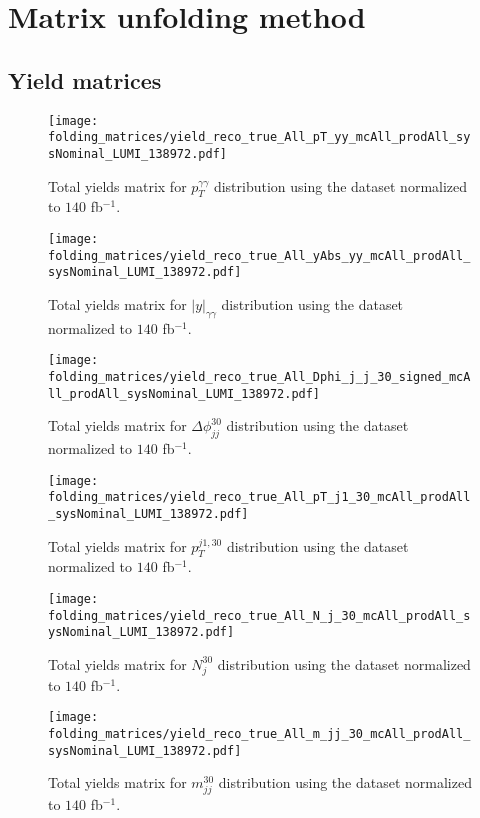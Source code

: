 \chapter{Matrix unfolding method}
\section{Yield matrices}
\vspace{1cm}
\begin{figure}[H]
\centering
\texttt{[image: folding\_matrices/yield\_reco\_true\_All\_pT\_yy\_mcAll\_prodAll\_sysNominal\_LUMI\_138972.pdf]}
\caption{Total yields matrix for $p_T^{\gamma\gamma}$ distribution using the dataset normalized to $140$ fb$^{-1}$.}
\end{figure}
\begin{figure}[H]
\centering
\texttt{[image: folding\_matrices/yield\_reco\_true\_All\_yAbs\_yy\_mcAll\_prodAll\_sysNominal\_LUMI\_138972.pdf]}
\caption{Total yields matrix for $|y|_{\gamma\gamma}$ distribution using the dataset normalized to $140$ fb$^{-1}$.}
\end{figure}
\begin{figure}[H]
\centering
\texttt{[image: folding\_matrices/yield\_reco\_true\_All\_Dphi\_j\_j\_30\_signed\_mcAll\_prodAll\_sysNominal\_LUMI\_138972.pdf]}
\caption{Total yields matrix for $\Delta\phi_{jj}^{30}$ distribution using the dataset normalized to $140$ fb$^{-1}$.}
\end{figure}
\begin{figure}[H]
\centering
\texttt{[image: folding\_matrices/yield\_reco\_true\_All\_pT\_j1\_30\_mcAll\_prodAll\_sysNominal\_LUMI\_138972.pdf]}
\caption{Total yields matrix for $p_T^{j1, 30}$ distribution using the dataset normalized to $140$ fb$^{-1}$.}
\end{figure}
\begin{figure}[H]
\centering
\texttt{[image: folding\_matrices/yield\_reco\_true\_All\_N\_j\_30\_mcAll\_prodAll\_sysNominal\_LUMI\_138972.pdf]}
\caption{Total yields matrix for $N_j^{30}$ distribution using the dataset normalized to $140$ fb$^{-1}$.}
\end{figure}
\begin{figure}[H]
\centering
\texttt{[image: folding\_matrices/yield\_reco\_true\_All\_m\_jj\_30\_mcAll\_prodAll\_sysNominal\_LUMI\_138972.pdf]}
\caption{Total yields matrix for $m_{jj}^{30}$ distribution using the dataset normalized to $140$ fb$^{-1}$.}
\end{figure}

